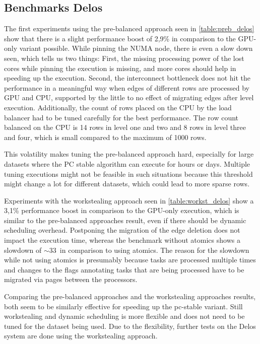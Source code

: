\subsection{Benchmarks Delos}

The first experiments using the pre-balanced approach seen in \ref{table:preb_delos} show that there is a slight performance boost of 2,9\% in comparison to the GPU-only variant possible. While pinning the NUMA node, there is even a slow down seen, which tells us two things: First, the missing processing power of the lost cores while pinning the execution is missing, and more cores should help in speeding up the execution. Second, the interconnect bottleneck does not hit the performance in a meaningful way when edges of different rows are processed by GPU and CPU, supported by the little to no effect of migrating edges after level execution. Additionally, the count of rows placed on the CPU by the load balancer had to be tuned carefully for the best performance. The row count balanced on the CPU is 14 rows in level one and two and 8 rows in level three and four, which is small compared to the maximum of 1000 rows.

This volatility makes tuning the pre-balanced approach hard, especially for large datasets where the PC stable algorithm can execute for hours or days. Multiple tuning executions might not be feasible in such situations because this threshold might change a lot for different datasets, which could lead to more sparse rows.


Experiments with the workstealing approach seen in \ref{table:workst_delos} show a 3,1\% performance boost in comparison to the GPU-only execution, which is similar to the pre-balanced approaches result, even if there should be dynamic scheduling overhead. Postponing the migration of the edge deletion does not impact the execution time, whereas the benchmark without atomics shows a slowdown of $\sim$33\ in comparison to using atomics. The reason for the slowdown while not using atomics is presumably because tasks are processed multiple times and changes to the flags annotating tasks that are being processed have to be migrated via pages between the processors.

Comparing the pre-balanced approaches and the workstealing approaches results, both seem to be similarly effective for speeding up the pc-stable variant. Still workstealing and dynamic scheduling is more flexible and does not need to be tuned for the dataset being used. Due to the flexibility, further tests on the Delos system are done using the workstealing approach.

